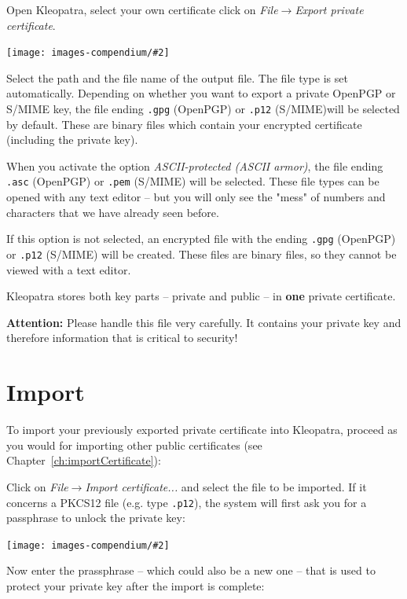 \documentclass[a4paper,11pt,oneside,openright,titlepage]{scrbook}
\newcommand{\Menu}[1]{\textit{#1}}
\newcommand{\Filename}[1]{\small{\texttt{#1}}\normalsize}
\newcommand{\IncludeImage}[2][]{
\begin{center}
  \texttt{[image: images-compendium/\#2]}%
\end{center}
}
\begin{document}
Open Kleopatra, select your own certificate click on
\Menu{File$\rightarrow$Export private certificate}.

\IncludeImage[width=0.6\textwidth]{sc-kleopatra-openpgp-exportSecretKey_en}

Select the path and the file name of the output file. The file type is
set automatically. Depending on whether you want to export a private
OpenPGP or S/MIME key, the file ending \Filename{.gpg} (OpenPGP) or
\Filename{.p12} (S/MIME)will be selected by default. These are binary
files which contain your encrypted certificate (including the private
key).

When you activate the option \Menu{ASCII-protected (ASCII
armor)}, the file ending \Filename{.asc} (OpenPGP)
or \Filename{.pem} (S/MIME) will be selected. These file types can be
opened with any text editor -- but you will only see the "mess" of
numbers and characters that we have already seen before.

If this option is not selected, an encrypted file with the ending
\Filename{.gpg} (OpenPGP) or \Filename{.p12} (S/MIME) will be created.
These files are binary files, so they cannot be viewed with a text
editor.

Kleopatra stores both key parts -- private and public -- in
\textbf{one} private certificate.

\textbf{Attention:} Please handle this file very carefully. It
contains your private key and therefore information that is critical
to security!

\clearpage
\section{Import}

To import your previously exported private certificate into Kleopatra,
proceed as you would for importing other public certificates (see
Chapter~\ref{ch:importCertificate}):

Click on \Menu{File$\rightarrow$Import certificate...} and select the
file to be imported. If it concerns a PKCS12 file (e.g. type
\Filename{.p12}), the system will first ask you for a passphrase to
unlock the private key:


\IncludeImage[width=0.5\textwidth]{sc-pinentry-p12-import-a_en}

Now enter the prassphrase -- which could also be a new one -- that is
used to protect your private key after the import is complete:
\end{document}
